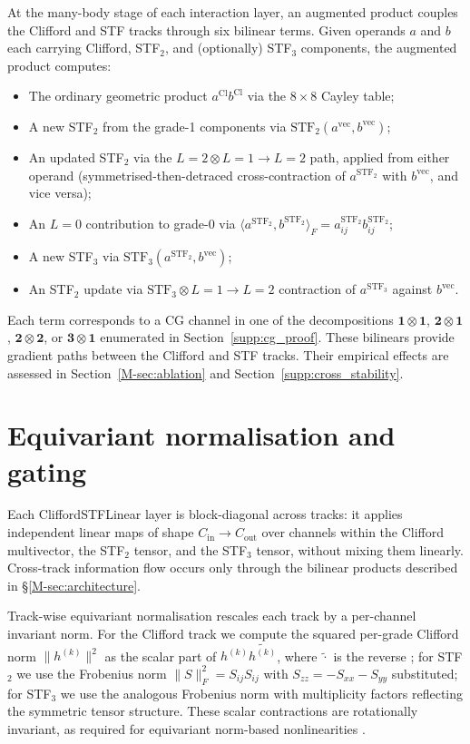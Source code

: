 At the many-body stage of each interaction layer, an augmented product couples the Clifford and STF tracks through six bilinear terms. Given operands $a$ and $b$ each carrying Clifford, STF$_2$, and (optionally) STF$_3$ components, the augmented product computes:
\begin{itemize}
    \item The ordinary geometric product $a^{\mathrm{Cl}} b^{\mathrm{Cl}}$ via the $8\times8$ Cayley table;
    \item A new STF$_2$ from the grade-1 components via $\mathrm{STF}_2(a^{\mathrm{vec}}, b^{\mathrm{vec}})$;
    \item An updated STF$_2$ via the $L{=}2 \otimes L{=}1 \to L{=}2$ path, applied from either operand (symmetrised-then-detraced cross-contraction of $a^{\mathrm{STF}_2}$ with $b^{\mathrm{vec}}$, and vice versa);
    \item An $L{=}0$ contribution to grade-0 via $\langle a^{\mathrm{STF}_2}, b^{\mathrm{STF}_2}\rangle_F = a_{ij}^{\mathrm{STF}_2} b_{ij}^{\mathrm{STF}_2}$;
    \item A new STF$_3$ via $\mathrm{STF}_3(a^{\mathrm{STF}_2}, b^{\mathrm{vec}})$;
    \item An STF$_2$ update via $\mathrm{STF}_3 \otimes L{=}1 \to L{=}2$ contraction of $a^{\mathrm{STF}_3}$ against $b^{\mathrm{vec}}$.
\end{itemize}
Each term corresponds to a CG channel in one of the decompositions $\mathbf{1}\otimes\mathbf{1}$, $\mathbf{2}\otimes\mathbf{1}$, $\mathbf{2}\otimes\mathbf{2}$, or $\mathbf{3}\otimes\mathbf{1}$ enumerated in Section~\ref{supp:cg_proof}. These bilinears provide gradient paths between the Clifford and STF tracks. Their empirical effects are assessed in Section~\ref{M-sec:ablation} and Section~\ref{supp:cross_stability}.

\section{Equivariant normalisation and gating}\label{supp:normalization}

Each CliffordSTFLinear layer is block-diagonal across tracks: it applies independent linear maps of shape $C_{\mathrm{in}} \to C_{\mathrm{out}}$ over channels within the Clifford multivector, the STF$_2$ tensor, and the STF$_3$ tensor, without mixing them linearly. Cross-track information flow occurs only through the bilinear products described in \S\ref{M-sec:architecture}.

Track-wise equivariant normalisation rescales each track by a per-channel invariant norm. For the Clifford track we compute the squared per-grade Clifford norm $\lVert h^{(k)}\rVert^2$ as the scalar part of $h^{(k)}\widetilde{h^{(k)}}$, where $\widetilde{\cdot}$ is the reverse \citep{doran2003geometric}; for STF$_2$ we use the Frobenius norm $\lVert S\rVert_F^2 = S_{ij}S_{ij}$ with $S_{zz} = -S_{xx}-S_{yy}$ substituted; for STF$_3$ we use the analogous Frobenius norm with multiplicity factors reflecting the symmetric tensor structure. These scalar contractions are rotationally invariant, as required for equivariant norm-based nonlinearities \citep{ruhe2023cgenn,zaverkin2024ictp}.

